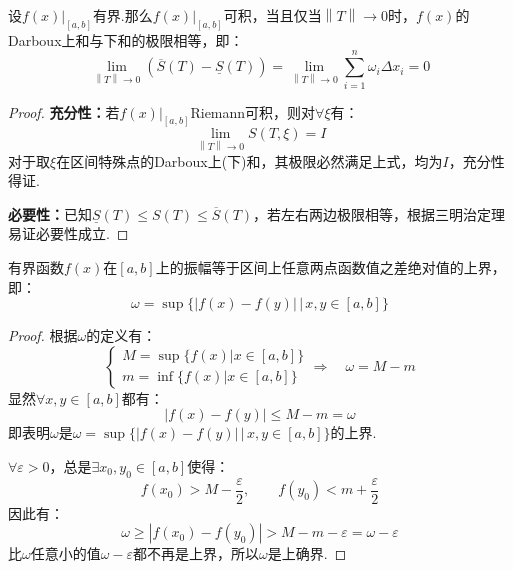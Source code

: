 \begin{theorem}
    \label{thm:DarbouxIntegrabilityCriterion}
    设$\left.f(x)\right|_{[a,b]}$有界.那么$\left.f(x)\right|_{[a,b]}$可积，当且仅当$\left\|T\right\| \to 0$时，$f(x)$的Darboux上和与下和的极限相等，即：
    \[\lim_{\left\|T\right\| \to 0}(\overline{S}(T) - \underline{S}(T)) = \lim_{\left\|T\right\| \to 0}\sum_{i=1}^{n}\omega_i \Delta x_i = 0\]
\end{theorem}

\begin{proof}
    \textbf{充分性：}若$\left.f(x)\right|_{[a,b]}$Riemann可积，则对$\forall \xi$有：
    \[\lim_{\left\|T\right\| \to 0} S(T,\xi) = I\]
    对于取$\xi$在区间特殊点的Darboux上(下)和，其极限必然满足上式，均为$I$，充分性得证.

    \textbf{必要性：}已知$\underline{S}(T) \leqslant S(T) \leqslant \overline{S}(T)$，若左右两边极限相等，根据三明治定理易证必要性成立.
\end{proof}

\begin{theorem}
    \label{thm:OscillationSup}
    有界函数$f(x)$在$[a,b]$上的振幅等于区间上任意两点函数值之差绝对值的上界，即：
    \[\omega = \sup\{|f(x) - f(y)|\,|\,x,y\in[a,b]\}\]
\end{theorem}

\begin{proof}
    根据$\omega$的定义有：
    \[\begin{cases}
        M = \sup\{f(x) | x\in[a,b]\}\\
        m = \inf\{f(x) | x\in[a,b]\}
    \end{cases} \Rightarrow\quad \omega = M-m\]
    显然$\forall x,y \in[a,b]$都有：
    \[|f(x)-f(y)| \leqslant M-m = \omega\]
    即表明$\omega$是$\omega = \sup\{|f(x) - f(y)|\,|\,x,y\in[a,b]\}$的上界.

    $\forall \varepsilon > 0$，总是$\exists x_0,y_0\in[a,b]$使得：
    \[f(x_0) > M - \frac{\varepsilon}{2},\qquad f(y_0) < m + \frac{\varepsilon}{2}\]
    因此有：
    \[\omega \geqslant |f(x_0) - f(y_0)| > M - m -\varepsilon = \omega - \varepsilon\]
    比$\omega$任意小的值$\omega-\varepsilon$都不再是上界，所以$\omega$是上确界.
\end{proof}


